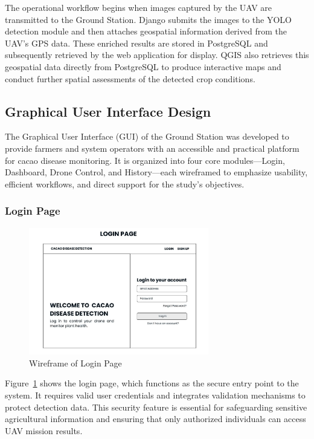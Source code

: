 The operational workflow begins when images captured by the UAV are transmitted to the Ground Station. Django submits the images to the YOLO detection module and then attaches geospatial information derived from the UAV’s GPS data. These enriched results are stored in PostgreSQL and subsequently retrieved by the web application for display. QGIS also retrieves this geospatial data directly from PostgreSQL to produce interactive maps and conduct further spatial assessments of the detected crop conditions.

\subsection{Graphical User Interface Design}

The Graphical User Interface (GUI) of the Ground Station was developed to provide farmers and system operators with an accessible and practical platform for cacao disease monitoring. It is organized into four core modules—Login, Dashboard, Drone Control, and History—each wireframed to emphasize usability, efficient workflows, and direct support for the study’s objectives.

\subsubsection*{Login Page}

\begin{figure}[H]
	\centering
	\caption{Wireframe of Login Page}
	\label{fig:LoginGUI}
	\includegraphics[width=0.7\textwidth]{figures/Login.pdf}
\end{figure}

Figure~\ref{fig:LoginGUI} shows the login page, which functions as the secure entry point to the system. It requires valid user credentials and integrates validation mechanisms to protect detection data. This security feature is essential for safeguarding sensitive agricultural information and ensuring that only authorized individuals can access UAV mission results.

